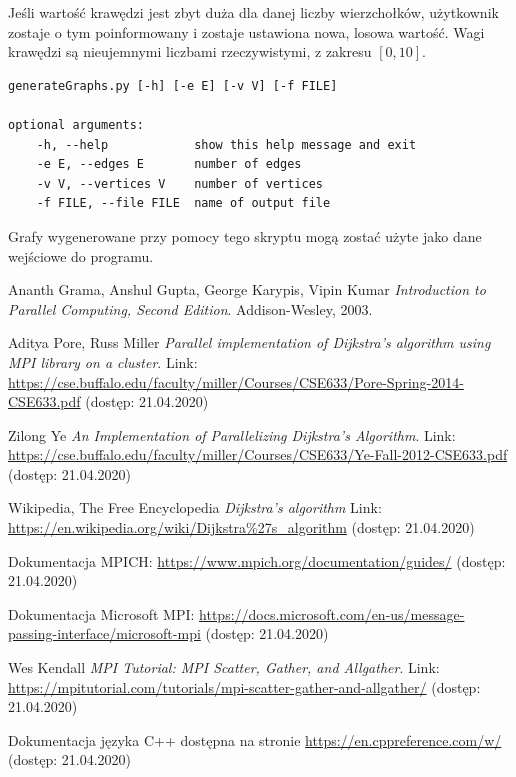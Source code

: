 \documentclass[12pt]{article}
\begin{document}
Jeśli wartość krawędzi jest zbyt duża dla danej liczby wierzchołków, użytkownik zostaje o tym poinformowany i zostaje ustawiona nowa, losowa wartość. Wagi krawędzi są nieujemnymi liczbami rzeczywistymi, z zakresu $[0, 10]$.

\begin{lstlisting}[caption={Pomoc skryptu \lstinline|generateGraphs.py|.}, captionpos=b ]
generateGraphs.py [-h] [-e E] [-v V] [-f FILE]

optional arguments:
	-h, --help            show this help message and exit
	-e E, --edges E       number of edges
	-v V, --vertices V    number of vertices
	-f FILE, --file FILE  name of output file
\end{lstlisting}

Grafy wygenerowane przy pomocy tego skryptu mogą zostać użyte jako dane wejściowe do programu.


\newpage
\begin{thebibliography}{9}
Ananth Grama, Anshul Gupta, George Karypis, Vipin Kumar 
\textit{Introduction to Parallel Computing, Second Edition}. 
Addison-Wesley, 2003.

Aditya Pore, Russ Miller
\textit{Parallel implementation of Dijkstra's algorithm using MPI library on a cluster}.
Link: \url{https://cse.buffalo.edu/faculty/miller/Courses/CSE633/Pore-Spring-2014-CSE633.pdf} (dostęp: 21.04.2020)

Zilong Ye
\textit{An Implementation of Parallelizing Dijkstra’s Algorithm}.
Link: \url{https://cse.buffalo.edu/faculty/miller/Courses/CSE633/Ye-Fall-2012-CSE633.pdf} (dostęp: 21.04.2020)

Wikipedia, The Free Encyclopedia
\textit{Dijkstra's algorithm}
Link: \url{https://en.wikipedia.org/wiki/Dijkstra\%27s_algorithm} (dostęp: 21.04.2020)

Dokumentacja MPICH: \url{https://www.mpich.org/documentation/guides/} (dostęp: 21.04.2020)

Dokumentacja Microsoft MPI: \url{https://docs.microsoft.com/en-us/message-passing-interface/microsoft-mpi} (dostęp: 21.04.2020)

Wes Kendall
\textit{MPI Tutorial: MPI Scatter, Gather, and Allgather}.
Link: \url{https://mpitutorial.com/tutorials/mpi-scatter-gather-and-allgather/} (dostęp: 21.04.2020)

Dokumentacja języka C++ dostępna na stronie \url{https://en.cppreference.com/w/} (dostęp: 21.04.2020)


\end{thebibliography}
\end{document}
